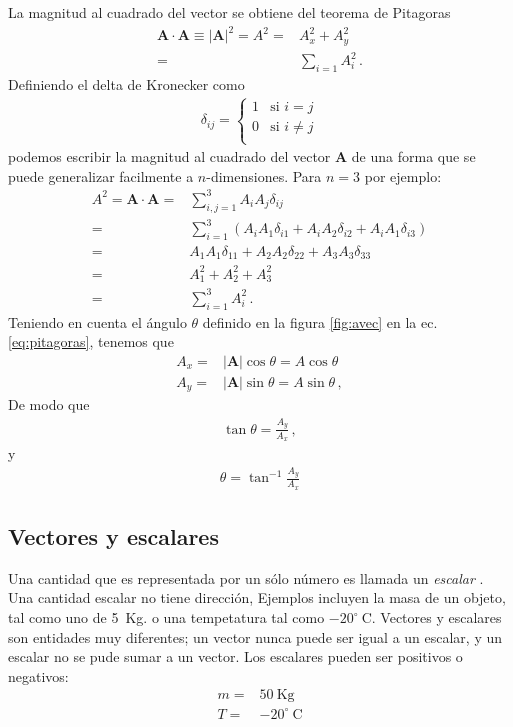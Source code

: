 \begin{frame}
La magnitud al cuadrado del vector se obtiene del teorema de Pitagoras
\begin{align}
  \label{eq:pitagoras}
  \mathbf{A}\cdot\mathbf{A}\equiv|\mathbf{A}|^2=A^2=&A_x^2+A_y^2\nonumber\\
  =&\sum_{i=1}A_i^2\,.
\end{align}
Definiendo el delta de Kronecker como
\begin{align}
  \delta_{ij}=
  \begin{cases}
    1&\text{si $i=j$}\\
    0&\text{si $i\neq j$}\\
  \end{cases}
\end{align}
podemos escribir la magnitud al cuadrado del vector $\mathbf{A}$ de una forma que se puede generalizar facilmente a $n$-dimensiones. Para $n=3$ por ejemplo:
\begin{align}
   A^2=\mathbf{A}\cdot\mathbf{A} =&\sum_{i,j=1}^3A_i A_j\delta_{ij}\nonumber\\
   =&\sum_{i=1}^3\left(A_iA_1\delta_{i1}+A_iA_2\delta_{i2}+A_iA_1\delta_{i3}\right)\nonumber\\
   =&A_1A_1\delta_{11}+A_2A_2\delta_{22}+A_3A_3\delta_{33}\nonumber\\
   =&A_1^2+A_2^2+A_3^2\nonumber\\
   =&\sum_{i=1}^3A_i^2\,.
\end{align}
Teniendo en cuenta el \'angulo $\theta$ definido en la figura \ref{fig:avec} en la ec.\eqref{eq:pitagoras}, tenemos que
\begin{align}
  A_x=&|\mathbf{A}|\cos\theta=A\cos\theta\nonumber\\
  A_y=&|\mathbf{A}|\sin\theta=A\sin\theta\,,
\end{align}
De modo que
\begin{align}
  \tan\theta=\frac{A_y}{A_x}\,,
\end{align}
y
\begin{align}
  \theta=\tan^{-1}\frac{A_y}{A_x}
\end{align}


\subsection{Vectores y escalares}


Una cantidad que es representada por un sólo número es llamada un \emph{escalar} \cite{MI}. Una cantidad escalar no tiene dirección, Ejemplos incluyen la masa de un objeto, tal como uno de 5~Kg. o una tempetatura tal como $-20^\circ\ $C. Vectores y escalares son entidades muy diferentes; un vector nunca puede ser igual a un escalar, y un escalar no se pude sumar a un vector. Los escalares pueden ser positivos o negativos:
\begin{align*}
  m=&50\ \text{Kg}\\
  T=&-20^\circ\ \text{C} 
\end{align*}


\end{frame}
